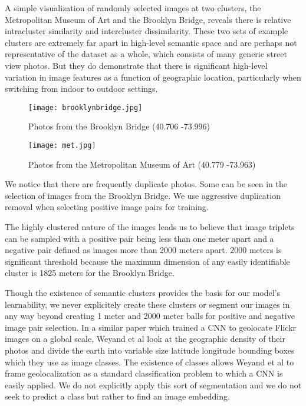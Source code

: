 A simple visualization of randomly selected images at two clusters, the Metropolitan Museum of Art and the Brooklyn Bridge, reveals there is relative intracluster similarity and intercluster dissimilarity. These two sets of example clusters are extremely far apart in high-level semantic space and are perhaps not representative of the dataset as a whole, which consists of many generic street view photos. But they do demonstrate that there is significant high-level variation in image features as a function of geographic location, particularly when switching from indoor to outdoor settings.

\begin{figure}[!htbp]
	\centering
	\texttt{[image: brooklynbridge.jpg]}
	\caption{Photos from the Brooklyn Bridge (40.706 -73.996)}
	\label{fig:brooklynbridge}
\end{figure}

\begin{figure}[!htbp]
	\centering
	\texttt{[image: met.jpg]}
	\caption{Photos from the Metropolitan Museum of Art (40.779 -73.963)}
	\label{fig:met}
\end{figure}

We notice that there are frequently duplicate photos. Some can be seen in the selection of images from the Brooklyn Bridge. We use aggressive duplication removal when selecting positive image pairs for training. 


The highly clustered nature of the images leads us to believe that image triplets can be sampled with a positive pair being less than one meter apart and a negative pair defined as images more than 2000 meters apart. 2000 meters is significant threshold because the maximum dimension of any easily identifiable cluster is 1825 meters for the Brooklyn Bridge. 



Though the existence of semantic clusters provides the basis for our model's learnability, we never explicitely create these clusters or segment our images in any way beyond creating 1 meter and 2000 meter balls for positive and negative image pair selection. In a similar paper which trained a CNN to geolocate Flickr images on a global scale, Weyand et al look at the geographic density of their photos and divide the earth into variable size latitude longitude bounding boxes which they use as image classes.\cite{weyand2016planet} The existence of classes allows Weyand et al to frame geolocalization as a standard classification problem to which a CNN is easily applied. We do not explicitly apply this sort of segmentation and we do not seek to predict a class but rather to find an image embedding.


